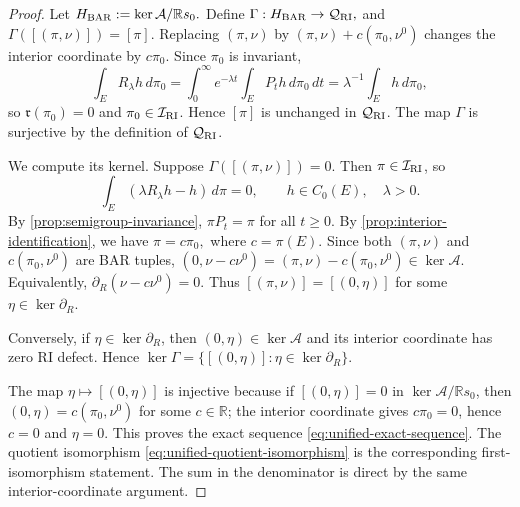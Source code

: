 \documentclass[aihp]{imsart}
\numberwithin{equation}{section}
\theoremstyle{plain}
\theoremstyle{definition}
\newcommand{\1}{\mathbf 1}
\begin{document}
\begin{proof}
Let $ H_{\rm BAR}:=\ker\mathcal A/\mathbb R s_0.$ Define $\Gamma:H_{\rm BAR}\to\mathcal Q_{\rm RI},$ and $\Gamma([(\pi,\nu)])=[\pi].$  Replacing $(\pi,\nu)$ by $(\pi,\nu)+c(\pi_0,\nu^0)$ changes the interior coordinate by $c\pi_0$.  Since $\pi_0$ is invariant,
\[
 \int_E R_\lambda h\,d\pi_0
 =\int_0^\infty e^{-\lambda t}\int_E P_t h\,d\pi_0\,dt
 =\lambda^{-1}\int_E h\,d\pi_0,
\]
so $\mathfrak r(\pi_0)=0$ and $\pi_0\in\mathcal I_{\rm RI}$.  Hence $[\pi]$ is unchanged in $\mathcal Q_{\rm RI}$.  The map $\Gamma$ is surjective by the definition of $\mathcal Q_{\rm RI}$.

We compute its kernel.  Suppose $\Gamma([(\pi,\nu)])=0$.  Then $\pi\in\mathcal I_{\rm RI}$, so
\[
 \int_E(\lambda R_\lambda h-h)\,d\pi=0,
 \qquad h\in C_0(E),\quad \lambda>0.
\]
By \cref{prop:semigroup-invariance}, $\pi P_t=\pi$ for all $t\ge0$.  By \cref{prop:interior-identification}, we have $\pi=c\pi_0,$ where $c=\pi(E).$ Since both $(\pi,\nu)$ and $c(\pi_0,\nu^0)$ are BAR tuples, $(0,\nu-c\nu^0)
 =(\pi,\nu)-c(\pi_0,\nu^0)
 \in\ker\mathcal A.$ Equivalently, $\partial_R(\nu-c\nu^0)=0.$ Thus $[(\pi,\nu)]=[(0,\eta)]$ for some $\eta\in\ker\partial_R$.

Conversely, if $\eta\in\ker\partial_R$, then $(0,\eta)\in\ker\mathcal A$ and its interior coordinate has zero RI defect.  Hence $\ker\Gamma=\{[(0,\eta)]:\eta\in\ker\partial_R\}.$

The map $\eta\mapsto[(0,\eta)]$ is injective because if $[(0,\eta)]=0$ in $\ker\mathcal A/\mathbb R s_0$, then $(0,\eta)=c(\pi_0,\nu^0)$ for some $c\in\mathbb R$; the interior coordinate gives $c\pi_0=0$, hence $c=0$ and $\eta=0$.  This proves the exact sequence \eqref{eq:unified-exact-sequence}.  The quotient isomorphism \eqref{eq:unified-quotient-isomorphism} is the corresponding first-isomorphism statement.  The sum in the denominator is direct by the same interior-coordinate argument.
\end{proof}
\end{document}
